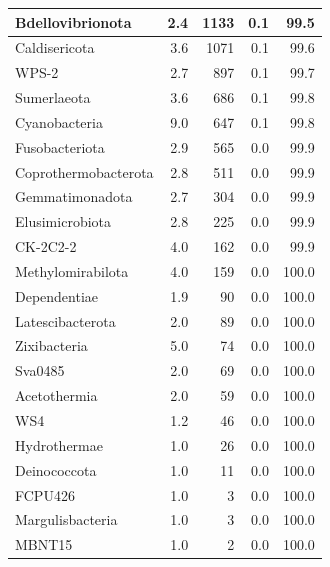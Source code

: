 \documentclass[
]{book}
\begin{document}
\begin{table}
\begin{tabular}{l|r|r|r|r}
\hline
Bdellovibrionota & 2.4 & 1133 & 0.1 & 99.5\\
\hline
Caldisericota & 3.6 & 1071 & 0.1 & 99.6\\
\hline
WPS-2 & 2.7 & 897 & 0.1 & 99.7\\
\hline
Sumerlaeota & 3.6 & 686 & 0.1 & 99.8\\
\hline
Cyanobacteria & 9.0 & 647 & 0.1 & 99.8\\
\hline
Fusobacteriota & 2.9 & 565 & 0.0 & 99.9\\
\hline
Coprothermobacterota & 2.8 & 511 & 0.0 & 99.9\\
\hline
Gemmatimonadota & 2.7 & 304 & 0.0 & 99.9\\
\hline
Elusimicrobiota & 2.8 & 225 & 0.0 & 99.9\\
\hline
CK-2C2-2 & 4.0 & 162 & 0.0 & 99.9\\
\hline
Methylomirabilota & 4.0 & 159 & 0.0 & 100.0\\
\hline
Dependentiae & 1.9 & 90 & 0.0 & 100.0\\
\hline
Latescibacterota & 2.0 & 89 & 0.0 & 100.0\\
\hline
Zixibacteria & 5.0 & 74 & 0.0 & 100.0\\
\hline
Sva0485 & 2.0 & 69 & 0.0 & 100.0\\
\hline
Acetothermia & 2.0 & 59 & 0.0 & 100.0\\
\hline
WS4 & 1.2 & 46 & 0.0 & 100.0\\
\hline
Hydrothermae & 1.0 & 26 & 0.0 & 100.0\\
\hline
Deinococcota & 1.0 & 11 & 0.0 & 100.0\\
\hline
FCPU426 & 1.0 & 3 & 0.0 & 100.0\\
\hline
Margulisbacteria & 1.0 & 3 & 0.0 & 100.0\\
\hline
MBNT15 & 1.0 & 2 & 0.0 & 100.0\\
\hline
\end{tabular}
\endgroup{}
\end{table}
\end{document}
